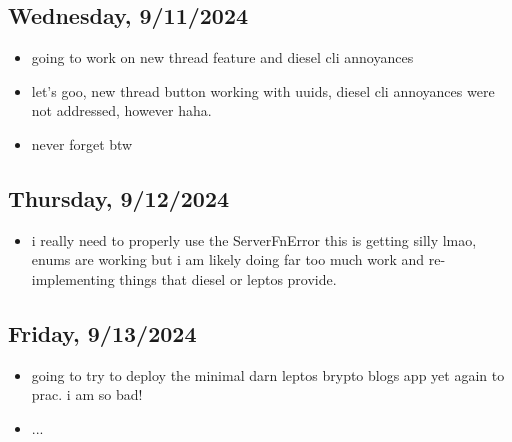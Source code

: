 \subsection*{Wednesday, 9/11/2024}
\begin{itemize}
    \item going to work on new thread feature and diesel cli annoyances
    \item let's goo, new thread button working with uuids, diesel cli annoyances
        were not addressed, however haha.
    \item never forget btw
\end{itemize}

\subsection*{Thursday, 9/12/2024}
\begin{itemize}
    \item i really need to properly use the ServerFnError this is getting silly
        lmao, enums are working but i am likely doing far too much work and
        re-implementing things that diesel or leptos provide.
\end{itemize}

\subsection*{Friday, 9/13/2024}
\begin{itemize}
    \item going to try to deploy the minimal darn leptos brypto blogs app yet
        again to prac. i am so bad!
    \item ...
\end{itemize}
